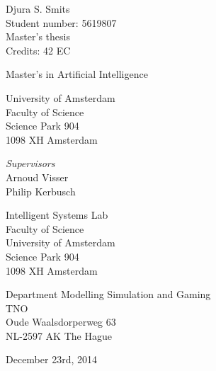 \documentclass[11pt, a4paper]{book}
\begin{document}
\begin{center}
Djura S. Smits\\
Student number: 5619807\\
Master's thesis\\
Credits: 42 EC

\vspace{0.5cm}

Master's in Artificial Intelligence



University of Amsterdam\\
Faculty of Science\\
Science Park 904\\
1098 XH Amsterdam
\vspace{7cm}

\emph{Supervisors}\\
Arnoud Visser\\
Philip Kerbusch

\vspace{1cm}

Intelligent Systems Lab\\
Faculty of Science\\
University of Amsterdam\\
Science Park 904\\
1098 XH  Amsterdam\\
\vspace{1cm}

Department Modelling Simulation and Gaming\\
TNO\\
Oude Waalsdorperweg 63 \\
NL-2597 AK The Hague\\

\vspace{1.5cm}

December 23rd, 2014
\end{center}
\newpage
\end{document}
